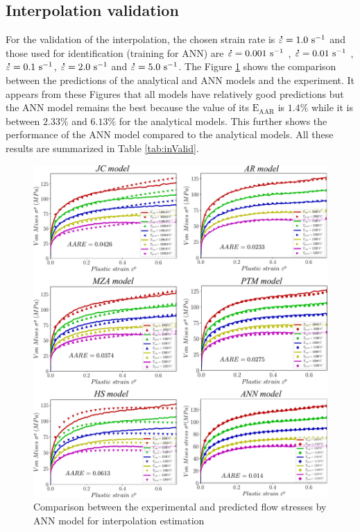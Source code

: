 \documentclass[twoside,english,1p,final,sort&compress]{elsarticle}
\theoremstyle{plain}
\newcommand{\mdot}[1]{\accentset{\mbox{\bfseries .}}{#1}}
\newcommand{\AARE}{\text{E}_\text{AAR}}
\newcommand{\ps}{\text{s}^{-1}}
\begin{document}
\subsection{Interpolation validation}
For the validation of the interpolation, the chosen strain rate is $\mdot\varepsilon = 1.0\ \ps$ and those used for identification (training for ANN) are $\mdot\varepsilon = 0.001\ \ps$ , $\mdot\varepsilon = 0.01\ \ps$ , $\mdot\varepsilon = 0.1\ \ps$, $\mdot\varepsilon = 2.0\ \ps$  and $\mdot\varepsilon = 5.0\ \ps$.
The Figure \ref{fig:inCombinaison} shows the comparison between the predictions of the analytical and ANN models and the experiment.
It appears from these Figures that all models have relatively good predictions but the ANN model remains the best because the value of its $\AARE$ is $1.4\%$ while it is between $2.33\%$ and $6.13\%$ for the analytical models.
This further shows the performance of the ANN model compared to the analytical models.
All these results are summarized in Table \ref{tab:inValid}.
\begin{figure}[!ht]
\centering
\includegraphics[width=1.02\columnwidth]
{Figures/inCombinaison}
\caption{Comparison between the experimental and predicted flow stresses by ANN model for interpolation estimation}
\label{fig:inCombinaison}
\end{figure}
\end{document}
